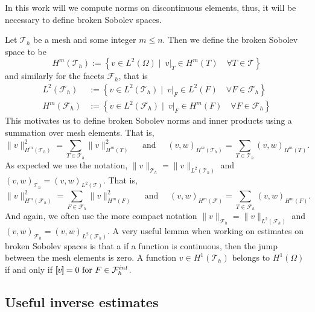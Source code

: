 In this work will we compute norms on discontinuous elements, thus, it will be necessary to define broken Sobolev spaces.

Let $\mathcal{T}_{h} $ be a mesh and some integer $m\le n$. Then we define the broken Sobolev space to be \[
H^{m}( \mathcal{T}_{h} ) := \left\{ v \in L^2( \Omega )  \mid \ v|_{T} \in H^{m}( T) \quad     \forall T \in  \mathcal{T} \right\}
\]
and similarly for the facets $\mathcal{F}_{h} $, that is
\[
    \begin{split}
        L^{2}( \mathcal{F}_{h} ) &:= \left\{ v \in L^2( \mathcal{T}_{h}  )  \mid   \ v|_{F} \in L^{2}( F)  \quad  \forall F \in  \mathcal{F}_{h}   \right\} \\
        H^{m}( \mathcal{F}_{h} ) &:= \left\{ v \in L^2( \mathcal{F}_{h}  )  \mid   \ v|_{F} \in H^{m}( F)  \quad  \forall F \in  \mathcal{F}_{h}   \right\}
    \end{split}
\]
This motivates us to define broken Sobolev norms and inner products using a summation over mesh elements. That is,
\[
 \| v \|_{H^{m}( \mathcal{T}_{h} ) }^{2} = \sum_{T \in  \mathcal{T}_{h} }^{} \| v  \|_{ H^{m}( T ) }^{2  } \quad \text{ and } \quad
 (v ,w )_{H^{m}( \mathcal{T}_{h} ) }^{} = \sum_{T \in \mathcal{T} _{h}}^{} (v ,w )_{ H^{m}( T ) }^{  } .
\]
As expected we use the notation,  $\| v \|_{\mathcal{T}_{h}} =  \| v \|_{L^{2}( \mathcal{T}_{h} ) }$ and  $(v ,w )_{ \mathcal{T}_{h} }^{} = (v ,w )_{L^2( \mathcal{T} ) }^{} $.
That is,
\[
 \| v \|_{H^{m}( \mathcal{F}_{h} ) }^{2} = \sum_{F \in  \mathcal{F}_{h} }^{} \| v  \|_{ H^{m}( F ) }^{2  } \quad \text{ and } \quad
 (v ,w )_{H^{m}( \mathcal{F} ) }^{} = \sum_{T \in \mathcal{F} _{h}}^{} (v ,w )_{ H^{m}( F ) }^{  } .
\]
And again, we often use the more compact notation $\| v \|_{\mathcal{F}_{h}} =  \| v \|_{L^{2}( \mathcal{F}_{h} ) }$ and  $(v ,w )_{ \mathcal{F}_{h} }^{} = (v ,w )_{L^2( \mathcal{F}_{h} ) }^{} $.
A very useful lemma when working on estimates on broken Sobolev spaces is that a if a function is continuous, then the jump between the mesh elements is zero. A function $ v \in  H^{1}( \mathcal{T}_{h} ) $ belongs to $ H^{1}( \Omega )  $ if and only
if $ \left[\!\!\left[  v  \right]\!\!\right]   = 0 \text{ for }  F \in \mathcal{F}^{int}_{h}$.



\subsection{Useful inverse estimates}%
\label{sub:useful_inverse_estimates}

